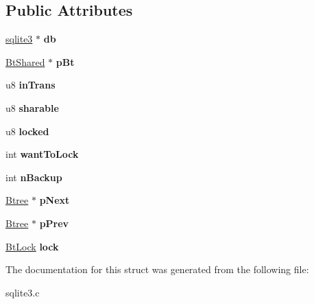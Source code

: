 \subsection*{Public Attributes}
\begin{DoxyCompactItemize}
\item 
\hypertarget{struct_btree_a2b3cfec48b6e9fcfd641d433816ae5c3}{\hyperlink{structsqlite3}{sqlite3} $\ast$ {\bfseries db}}\label{struct_btree_a2b3cfec48b6e9fcfd641d433816ae5c3}

\item 
\hypertarget{struct_btree_a63bab5d744d48d14368af048dddf2f20}{\hyperlink{struct_bt_shared}{Bt\-Shared} $\ast$ {\bfseries p\-Bt}}\label{struct_btree_a63bab5d744d48d14368af048dddf2f20}

\item 
\hypertarget{struct_btree_a50007448960c05dfd1fdc7db3e277685}{u8 {\bfseries in\-Trans}}\label{struct_btree_a50007448960c05dfd1fdc7db3e277685}

\item 
\hypertarget{struct_btree_a114f157127c76a1fbad8292e4b39c4dd}{u8 {\bfseries sharable}}\label{struct_btree_a114f157127c76a1fbad8292e4b39c4dd}

\item 
\hypertarget{struct_btree_a16fc8292bae9a66cfec03f6cb82d06a8}{u8 {\bfseries locked}}\label{struct_btree_a16fc8292bae9a66cfec03f6cb82d06a8}

\item 
\hypertarget{struct_btree_a97368ea300f0b74b8e80ea07da0cea2a}{int {\bfseries want\-To\-Lock}}\label{struct_btree_a97368ea300f0b74b8e80ea07da0cea2a}

\item 
\hypertarget{struct_btree_a7a3e7cf38bc9c3021a9e270a54ecfb1e}{int {\bfseries n\-Backup}}\label{struct_btree_a7a3e7cf38bc9c3021a9e270a54ecfb1e}

\item 
\hypertarget{struct_btree_a9e6d2ca44c10ed8ef0be004225a74ef5}{\hyperlink{struct_btree}{Btree} $\ast$ {\bfseries p\-Next}}\label{struct_btree_a9e6d2ca44c10ed8ef0be004225a74ef5}

\item 
\hypertarget{struct_btree_a0423f1c55c1fe6812161a49bb2bf604f}{\hyperlink{struct_btree}{Btree} $\ast$ {\bfseries p\-Prev}}\label{struct_btree_a0423f1c55c1fe6812161a49bb2bf604f}

\item 
\hypertarget{struct_btree_a943ed8799c9943f753a88cf44f1632dc}{\hyperlink{struct_bt_lock}{Bt\-Lock} {\bfseries lock}}\label{struct_btree_a943ed8799c9943f753a88cf44f1632dc}

\end{DoxyCompactItemize}


The documentation for this struct was generated from the following file\-:\begin{DoxyCompactItemize}
\item 
sqlite3.\-c\end{DoxyCompactItemize}
